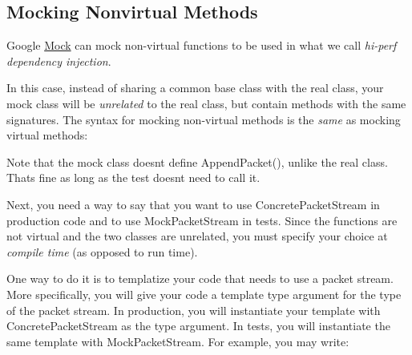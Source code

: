 \subsection*{Mocking Nonvirtual Methods}

Google \mbox{\hyperlink{classMock}{Mock}} can mock non-\/virtual functions to be used in what we call {\itshape hi-\/perf dependency injection}.

In this case, instead of sharing a common base class with the real class, your mock class will be {\itshape unrelated} to the real class, but contain methods with the same signatures. The syntax for mocking non-\/virtual methods is the {\itshape same} as mocking virtual methods\+:


\begin{DoxyCode}{0}
\DoxyCodeLine{\};}
\DoxyCodeLine{}
\DoxyCodeLine{\};}
\end{DoxyCode}


Note that the mock class doesn\textquotesingle{}t define {\ttfamily Append\+Packet()}, unlike the real class. That\textquotesingle{}s fine as long as the test doesn\textquotesingle{}t need to call it.

Next, you need a way to say that you want to use {\ttfamily Concrete\+Packet\+Stream} in production code and to use {\ttfamily Mock\+Packet\+Stream} in tests. Since the functions are not virtual and the two classes are unrelated, you must specify your choice at {\itshape compile time} (as opposed to run time).

One way to do it is to templatize your code that needs to use a packet stream. More specifically, you will give your code a template type argument for the type of the packet stream. In production, you will instantiate your template with {\ttfamily Concrete\+Packet\+Stream} as the type argument. In tests, you will instantiate the same template with {\ttfamily Mock\+Packet\+Stream}. For example, you may write\+:


